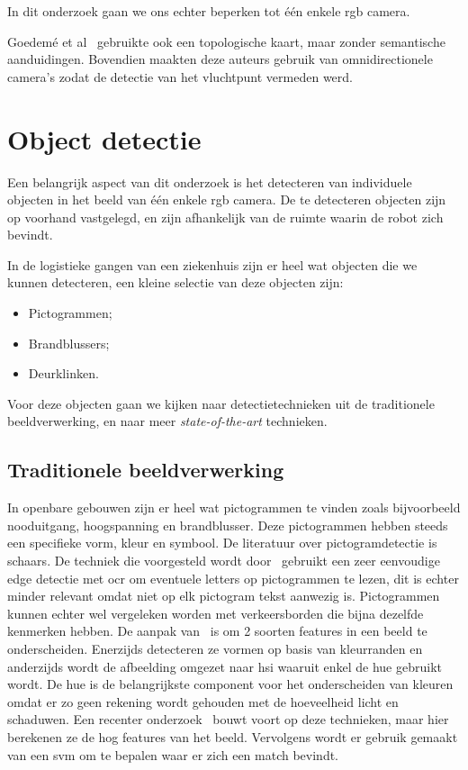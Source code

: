         In dit onderzoek gaan we ons echter beperken tot \'{e}\'{e}n enkele \gls{rgb} camera.

        Goedem\'{e} et al~\cite{goedeme2007omnidirectional} gebruikte ook een topologische kaart, maar zonder semantische aanduidingen.
        Bovendien maakten deze auteurs gebruik van omnidirectionele camera's zodat de detectie van het vluchtpunt vermeden werd.
        
        
    \section{Object detectie}\label{sec:object_det}

        Een belangrijk aspect van dit onderzoek is het detecteren van individuele objecten in het beeld van \'{e}\'{e}n enkele \gls{rgb} camera.
        De te detecteren objecten zijn op voorhand vastgelegd, en zijn afhankelijk van de ruimte waarin de robot zich bevindt.

        In de logistieke gangen van een ziekenhuis zijn er heel wat objecten die we kunnen detecteren, een kleine selectie van deze objecten zijn:

        \begin{itemize}
            \item Pictogrammen;
            \item Brandblussers;
            \item Deurklinken.
        \end{itemize}

        Voor deze objecten gaan we kijken naar detectietechnieken uit de traditionele beeldverwerking, en naar meer \textit{state-of-the-art} technieken.


        \subsection{Traditionele beeldverwerking} \label{sec:trad_obj_det}
            In openbare gebouwen zijn er heel wat pictogrammen te vinden zoals bijvoorbeeld nooduitgang, hoogspanning en brandblusser. Deze pictogrammen hebben steeds een specifieke vorm, kleur en symbool.
            De literatuur over pictogramdetectie is schaars. De techniek die voorgesteld wordt door~\cite{swathika2016} gebruikt een zeer eenvoudige edge detectie met \gls{ocr} om eventuele letters op pictogrammen te lezen, dit is echter minder relevant omdat niet op elk pictogram tekst aanwezig is. Pictogrammen kunnen echter wel vergeleken worden met verkeersborden die bijna dezelfde kenmerken hebben.
            De aanpak van~\cite{Fang2003} is om 2 soorten features in een beeld te onderscheiden. Enerzijds detecteren ze vormen op basis van kleurranden en anderzijds wordt de
            afbeelding omgezet naar \gls{hsi} waaruit enkel de hue gebruikt wordt. De hue is de belangrijkste component voor het onderscheiden van kleuren omdat er zo geen rekening wordt gehouden
            met de hoeveelheid licht en schaduwen.
            Een recenter onderzoek~\cite{Zabihi2017} bouwt voort op deze technieken, maar hier berekenen ze de \gls{hog} features van het beeld.
            Vervolgens wordt er gebruik gemaakt van een \gls{svm} om te bepalen waar er zich een match bevindt.

